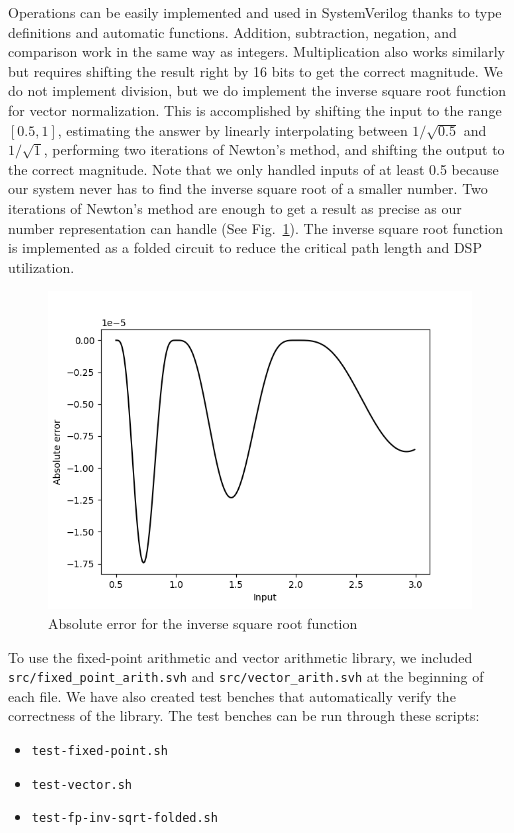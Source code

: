 \documentclass[conference]{IEEEtran}
\begin{document}
Operations can be easily implemented and used in SystemVerilog thanks to type definitions and automatic functions. Addition, subtraction, negation, and comparison work in the same way as integers. Multiplication also works similarly but requires shifting the result right by 16 bits to get the correct magnitude. We do not implement division, but we do implement the inverse square root function for vector normalization. This is accomplished by shifting the input to the range $[0.5, 1]$, estimating the answer by linearly interpolating between $1/\sqrt{0.5}$ and $1/\sqrt{1}$, performing two iterations of Newton's method, and shifting the output to the correct magnitude. Note that we only handled inputs of at least 0.5 because our system never has to find the inverse square root of a smaller number. Two iterations of Newton's method are enough to get a result as precise as our number representation can handle (See Fig.~\ref{newton-graph}). The inverse square root function is implemented as a folded circuit to reduce the critical path length and DSP utilization.

\begin{figure}
\centerline{\includegraphics[scale=0.5]{newton.png}}
\caption{Absolute error for the inverse square root function}
\label{newton-graph}
\end{figure}

To use the fixed-point arithmetic and vector arithmetic library, we included \texttt{src/fixed\_point\_arith.svh} and \texttt{src/vector\_arith.svh} at the beginning of each file. We have also created test benches that automatically verify the correctness of the library. The test benches can be run through these scripts:
\begin{itemize}
    \item \texttt{test-fixed-point.sh}
    \item \texttt{test-vector.sh}
    \item \texttt{test-fp-inv-sqrt-folded.sh}
\end{itemize}
\end{document}
